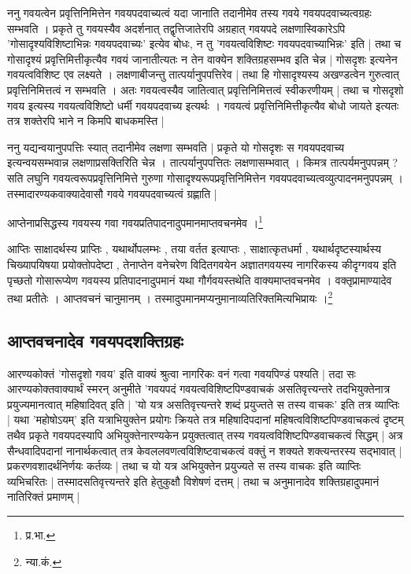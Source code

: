 ननु गवयत्वेन प्रवृत्तिनिमित्तेन गवयपदवाच्यत्वं यदा जानाति तदानीमेव तस्य गवये गवयपदवाच्यत्वग्रहः सम्भवति । प्रकृते तु गवयस्यैव अदर्शनात् तद्वृत्तिजातेरपि अग्रहात् गवयपदे लक्षणास्विकारेऽपि 'गोसादृश्यविशिष्टाभिन्नः गवयपदवाच्यः' इत्येव बोधः, न तु 'गवयत्वविशिष्टः गवयपदवाच्याभिन्नः' इति | तथा च गोसादृश्यं प्रवृत्तिमित्तीकृत्यैव गवयं जानातीत्यतः न तेन वाक्येन शक्तिग्रहसम्भव इति चेन्न |  गोसदृशः इत्यनेन गवयत्वविशिष्ट एव लक्ष्यते । लक्षणाबीजन्तु तात्पर्यानुपपत्तिरेव | तथा हि  गोसादृश्यस्य अखण्डत्वेन गुरुत्वात् प्रवृत्तिनिमित्तत्वं न सम्भवति । अतः गवयत्वस्यैव जातित्वात् प्रवृत्तिनिमित्तत्वं स्वीकरणीयम् | तथा च गोसदृशो गवय इत्यस्य गवयत्वविशिष्टो धर्मी गवयपदवाच्य इत्यर्थः । गवयत्वं प्रवृत्तिनिमित्तीकृत्यैव बोधो जायते इत्यतः तत्र शक्तेरपि भाने न किमपि बाधकमस्ति | 

ननु यद्यन्वयानुपपत्तिः स्यात् तदानीमेव लक्षणा सम्भवति | प्रकृते यो गोसदृशः स गवयपदवाच्य इत्यन्वयसम्भवान्न लक्षणाप्रसक्तिरिति चेन्न । तात्पर्यानुपपत्तितः लक्षणासम्भवात् ।  किमत्र तात्पर्यमनुपपन्नम् ? सति लघुनि गवयत्वरूपप्रवृत्तिनिमित्ते गुरुणा गोसादृश्यरूपप्रवृत्तिनिमित्तेन गवयपदवाच्यत्वव्युत्पादनमनुपपन्नम् । तस्मादारण्यकवाक्यादेवासौ गवये गवयपदवाच्यत्वं ग्रह्णाति |


{\fontsize{11.7}{0}\selectfont\s  आप्तेनाप्रसिद्धस्य गवयस्य गवा गवयप्रतिपादनादुपमानमाप्तवचनमेव ।\footnote{प्र.भा.}

आप्तिः साक्षादर्थस्य प्राप्तिः , यथार्थोपलम्भः , तया वर्तत इत्याप्तः , साक्षात्कृतधर्मा , यथार्थदृष्टस्यार्थस्य चिख्यापयिषया प्रयोक्तोपदेष्टा , तेनाप्तेन वनेचरेण विदितगवयेन अज्ञातगवयस्य नागरिकस्य कीदृग्गवय इति पृच्छतो गोसारूप्येण गवयस्य प्रतिपादनादुपमानं यथा गौर्गवयस्तथेति वाक्यमाप्तवचनमेव । वक्तृप्रामाण्यादेव तथा प्रतीतेः । आप्तवचनं चानुमानम् । तस्मादुपमानमप्यनुमानाव्यतिरिक्तमित्यभिप्रायः ।\footnote{न्या.कं.}}

\subsection{आप्तवचनादेव गवयपदशक्तिग्रहः}

आरण्यकोक्तं 'गोसदृशो गवय' इति वाक्यं श्रुत्वा नागरिकः वनं गत्वा गवयपिण्डं पश्यति | तदा सः आरण्यकोक्तवाक्यार्थं स्मरन् अनुमीते 'गवयपदं गवयत्वविशिष्टपिण्डवाचकं असतिवृत्त्यन्तरे तदभियुक्तेनात्र प्रयुज्यमानत्वात् महिषादिवत् इति | 'यो यत्र असतिवृत्त्यन्तरे शब्दं प्रयुज्तते स तस्य वाचकः' इति तत्र व्याप्तिः | यथा 'महोषोऽयम्' इति यत्राभियुक्तेन प्रयोगः क्रियते तत्र महिषादिपदानां महिषत्वविशिष्टपिण्डवाचकत्वं दृष्टम् तथैव प्रकृते गवयपदस्यापि अभियुक्तेनारण्यकेन प्रयुक्तत्वात् तस्य गवयत्वविशिष्टपिण्डवाचकत्वं सिद्धम् | अत्र सैन्धवादिपदानां नानार्थकत्वात् तत्र केवललवणत्वविशिष्टवाचकत्वं वक्तुं न शक्यते शक्त्यन्तरस्य सद्भावात् | प्रकरणवशादर्थनिर्णयः कर्तव्यः | तथा च यो यत्र अभियुक्तेन प्रयुज्यते स तस्य वाचकः इति व्याप्तिः व्यभिचरितः | तस्मादसतिवृत्त्यन्तरे इति हेतुकुक्षौ विशेषणं दत्तम् | तथा च अनुमानादेव शक्तिग्रहादुपमानं नातिरिक्तं प्रमाणम् |

